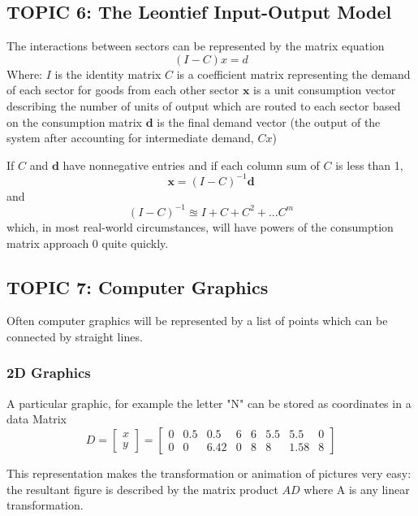 \documentclass[12pt]{article} %
\begin{document}

\subsection{TOPIC 6: The Leontief Input-Output Model}
The interactions between sectors can be represented by the matrix equation
$$(I - C)x = d$$
Where:
$I$ is the identity matrix
$C$ is a coefficient matrix representing the demand of each sector for goods from each other sector
$\mathbf{x}$ is a unit consumption vector describing the number of units  of output which are routed to each sector based on the consumption matrix 
$\mathbf{d}$ is the final demand vector (the output of the system after accounting for intermediate demand, $Cx$)

If $C$ and $\mathbf{d}$ have nonnegative entries and if each column sum of $C$ is less than 1, 
$$\mathbf{x} = (I - C)^{-1} \mathbf{d}$$
and
$$(I - C)^{-1} \approxeq I + C + C^2 + ... C^m$$
which, in most real-world circumstances, will have powers of the consumption matrix approach 0 quite quickly.

\subsection{TOPIC 7: Computer Graphics}

Often computer graphics will be represented by a list of points which can be connected by straight lines. 

\subsubsection{2D Graphics}
A particular graphic, for example the letter "N" can be stored as coordinates in a data Matrix
$$D = \begin{bmatrix}
	x\\y
\end{bmatrix} = \begin{bmatrix}
	0 & 0.5 & 0.5 & 6 & 6 & 5.5 & 5.5 & 0\\
	0 & 0 & 6.42 & 0 & 8 & 8 & 1.58 & 8
\end{bmatrix}$$

This representation makes the transformation or animation of pictures very easy: the resultant figure is described by the matrix product $AD$ where A is any linear transformation.
\end{document}
